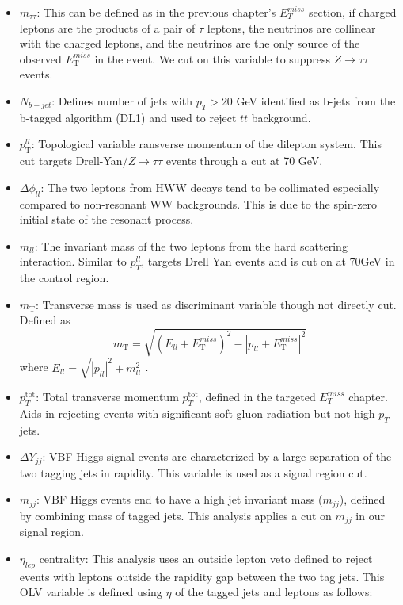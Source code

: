 \begin{itemize}
\item $m_{\tau \tau}$: This can be defined as in the previous chapter's $E_T^{miss}$ section, if charged leptons are the products of a pair of $\tau$ leptons, the neutrinos are collinear with the charged leptons, and the neutrinos are the only source of the observed $E_\mathrm{{T}}^{miss}$ in the event. We cut on this variable to suppress $Z\rightarrow\tau\tau$  events. 
\item $N_{b-jet}$: Defines number of jets with $p_T >20$ GeV identified as b-jets from the b-tagged algorithm (DL1) and used to reject $t\bar{t}$ background.
\item $p_\mathrm{{T}}^{ll}$: Topological variable ransverse momentum of the dilepton system. This cut targets Drell-Yan/$Z\rightarrow\tau\tau$ events through a cut at 70 GeV. 
\item $\Delta \phi_{ll}$: The two leptons from HWW decays tend to be collimated especially compared to non-resonant WW backgrounds. This is due to the spin-zero initial state of the resonant process. 
\item $m_{ll}$: The invariant mass of the two leptons from the hard scattering interaction. Similar to $p_T^{ll}$, targets Drell Yan events and is cut on at 70GeV in the control region.
\item $m_\mathrm{{T}}$: Transverse mass is used as discriminant variable though not directly cut. Defined as
\begin{equation}
m_\mathrm{{T}} = \sqrt{ {(E_{ll} + E_\mathrm{{T}}^{miss})}^2 - {|p_{ll} + E_\mathrm{{T}}^{miss}|}^2 }
\end{equation}
  where $E_{ll} = \sqrt{|p_{ll}|^2 + m_{ll}^2 }$ .
\item $p_T^\mathrm{tot}$:
Total transverse momentum $p_T^\mathrm{tot}$, defined in the targeted $E_T^{miss}$ chapter. Aids in rejecting events with significant soft gluon radiation but not high $p_T$ jets.
\item  $\Delta Y_{jj}$: VBF Higgs signal events are characterized by a large separation of the two tagging jets in rapidity. This variable is used as a signal region cut. 
\item $m_{jj}$:
VBF Higgs events end to have a high jet invariant mass ($m_{jj}$), defined by combining mass of tagged jets. This analysis applies a cut on $m_{jj}$ in our signal region. 
\item $\eta_{lep}$ centrality: This analysis uses an outside lepton veto defined to reject events with leptons outside the rapidity gap between the two tag jets. This OLV variable is defined using $\eta$ of the tagged jets and leptons as follows:

\end{itemize}
